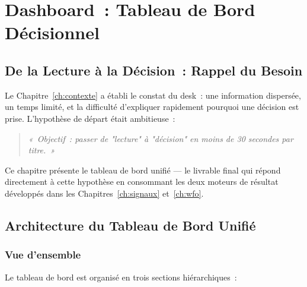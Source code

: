 \chapter{Dashboard~: Tableau de Bord Décisionnel}
\label{ch:dashboard}

\section{De la Lecture à la Décision~: Rappel du Besoin}
\label{sec:besoin_rappel}

Le Chapitre~\ref{ch:contexte} a établi le constat du desk~: une information dispersée,
un temps limité, et la difficulté d'expliquer rapidement pourquoi une décision est prise.
L'hypothèse de départ était ambitieuse~:

\begin{quote}
\textit{«~Objectif~: passer de "lecture" à "décision" en moins de 30 secondes par titre.~»}
\cite{rapport_s1}
\end{quote}

Ce chapitre présente le tableau de bord unifié — le livrable final qui répond directement
à cette hypothèse en consommant les deux moteurs de résultat développés dans les
Chapitres~\ref{ch:signaux} et~\ref{ch:wfo}.

\section{Architecture du Tableau de Bord Unifié}
\label{sec:dashboard_architecture}

\subsection{Vue d'ensemble}

Le tableau de bord est organisé en trois sections hiérarchiques~:

